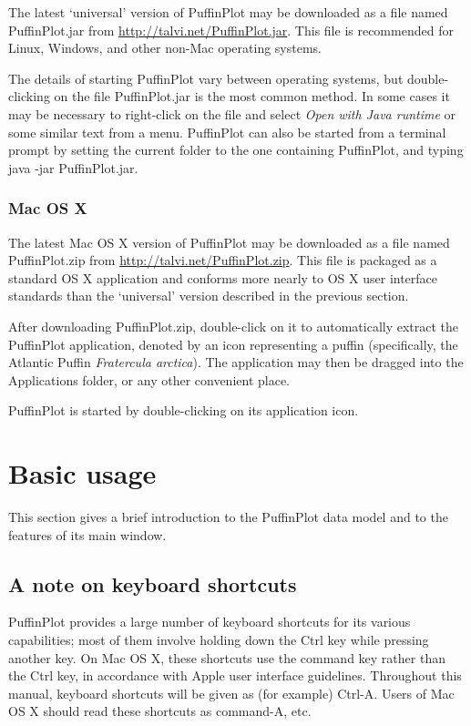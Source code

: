 \documentclass[a4paper]{article}
\begin{document}
The latest `universal' version of PuffinPlot may be downloaded as a file
named \textsf{PuffinPlot.jar} from
\url{http://talvi.net/PuffinPlot.jar}. This file is recommended for
Linux, Windows, and other non-Mac operating systems.

The details of starting PuffinPlot vary between operating systems, but
double-clicking on the file \textsf{PuffinPlot.jar} is the most common
method. In some cases it may be necessary to right-click on the file and
select \emph{Open with Java runtime} or some similar text from a menu.
PuffinPlot can also be started from a terminal prompt by setting the
current folder to the one containing PuffinPlot, and typing
\textsf{java -jar PuffinPlot.jar}.

\subsubsection{Mac OS X}

The latest Mac OS X version of PuffinPlot may be downloaded as a file
named \textsf{PuffinPlot.zip} from
\url{http://talvi.net/PuffinPlot.zip}. This file is packaged as a
standard OS X application and conforms more nearly to OS X user
interface standards than the `universal' version described in the
previous section.

After downloading \textsf{PuffinPlot.zip}, double-click on it to
automatically extract the PuffinPlot application, denoted by an icon
representing a puffin (specifically, the Atlantic Puffin
\emph{Fratercula arctica}). The application may then be dragged into the
Applications folder, or any other convenient place.

PuffinPlot is started by double-clicking on its application icon.

\section{Basic usage}

This section gives a brief introduction to the PuffinPlot data model and
to the features of its main window.

\subsection{A note on keyboard shortcuts}

PuffinPlot provides a large number of keyboard shortcuts for its various
capabilities; most of them involve holding down the Ctrl key while
pressing another key. On Mac OS X, these shortcuts use the command key
rather than the Ctrl key, in accordance with Apple user interface
guidelines. Throughout this manual, keyboard shortcuts will be given as
(for example) Ctrl-A. Users of Mac OS X should read these shortcuts as
command-A, etc.
\end{document}

